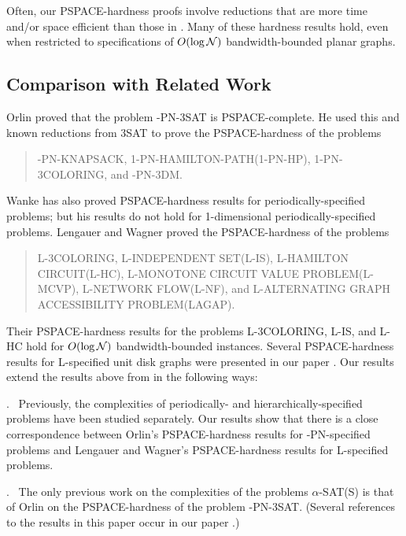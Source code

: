 Often, our {\sf PSPACE-}hardness  proofs involve 
reductions that are more time and/or space efficient than those in 
\cite{Or82a,LW92}. Many of these hardness results hold, even when 
restricted to specifications of $O(\log {\cal N})$ 
bandwidth-bounded planar graphs.
 



\subsection{Comparison with Related Work}\label{sec:comp}
Orlin \cite{Or82a} proved that the problem {-PN-3SAT} is 
{\sf PSPACE-}complete. He used this and known reductions from {\sf 3SAT} 
to prove the {\sf PSPACE-}hardness of the problems 
\begin{quote}
{-PN-KNAPSACK, 1-PN-HAMILTON-PATH(1-PN-HP), 1-PN-3COLORING,} and 
{-PN-3DM}.
\end{quote}
Wanke \cite{Wa93} has also proved {\sf PSPACE-}hardness results for periodically-specified problems; but his results do not hold for 1-dimensional 
periodically-specified problems. Lengauer and Wagner \cite{LW92} proved
the {\sf PSPACE}-hardness of the problems 
\begin{quote}
{\sf L-3COLORING, L-INDEPENDENT SET(L-IS), L-HAMILTON CIRCUIT(L-HC), L-MONOTONE CIRCUIT  VALUE PROBLEM(L-MCVP), L-NETWORK FLOW(L-NF),} and {\sf L-ALTERNATING GRAPH ACCESSIBILITY PROBLEM(LAGAP).}
\end{quote}
Their {\sf PSPACE-}hardness results for the problems {\sf L-3COLORING, L-IS,}
and {\sf L-HC} hold for $O(\log {\cal N})$ bandwidth-bounded instances. Several
{\sf PSPACE-}hardness results for {\sf L-}specified unit disk graphs were 
presented in our paper \cite{MR+93}. 
Our results extend the results above from \cite{Or82a,LW92}  
in the following ways:

{}.~ Previously, the complexities of periodically- and hierarchically-specified
problems have been studied separately. Our results show that there is a
 close correspondence between Orlin's {\sf PSPACE-}hardness results for {-PN-}specified problems and Lengauer and Wagner's {\sf PSPACE-}hardness 
results for {\sf L-}specified problems.

\smallskip
{}.~
The only previous work on the complexities of the problems 
$\alpha$-{\sf SAT(S)} is that of Orlin \cite{Or82a} on the 
{\sf PSPACE-}hardness of the problem {-PN-3SAT}. (Several references
to the results in this paper occur in our paper \cite{MR+93}.)

